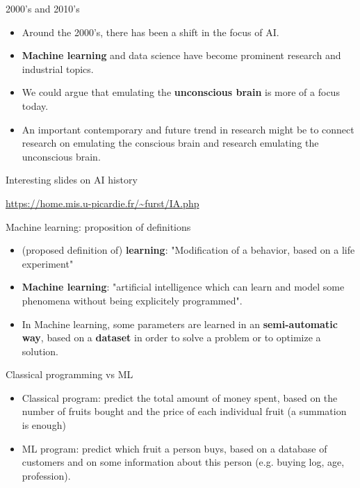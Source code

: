 \documentclass[usenames,dvipsnames]{beamer}
\begin{document}
\begin{frame}{2000's and 2010's}
    \begin{itemize}
        \item Around the 2000's, there has been a shift in the focus of AI.
        \item \textbf{Machine learning} and data science have become prominent research and industrial topics.
        \item We could argue that emulating the \textbf{{unconscious brain}} is
            more of a focus today.
        \item An important contemporary and future trend in research might be
            to connect research on emulating the conscious brain and research
            emulating the unconscious brain.
    \end{itemize}
\end{frame}

\begin{frame}{Interesting slides on AI history}

    \url{https://home.mis.u-picardie.fr/~furst/IA.php} 

\end{frame}

\begin{frame}{Machine learning: proposition of definitions}
    \begin{itemize}
        \item (proposed definition of) \textbf{learning}: "Modification of a behavior, based on a life experiment"
        \item \textbf{{Machine learning}}: "artificial intelligence which can learn
    and model some phenomena without being explicitely programmed".
        \item In Machine learning, some parameters are learned in an
            \textbf{semi-automatic way}, based on a \textbf{dataset} in order to solve a problem or to optimize a
            solution.
    \end{itemize}
\end{frame}

\begin{frame}{Classical programming vs ML}
    \begin{itemize}
	\item Classical program: predict the total amount of money spent, based on the number of fruits bought and the price of each individual fruit (a summation is enough)
	\item ML program: predict which fruit a person buys, based on a database of customers and on some information about this person (e.g. buying log, age, profession).
    \end{itemize}
\end{frame}
\end{document}
